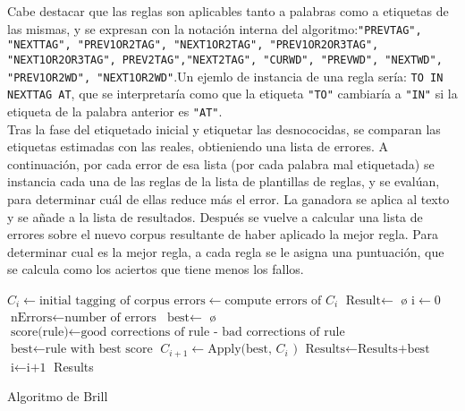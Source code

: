 Cabe destacar que las reglas son aplicables tanto a palabras como a etiquetas de las mismas, y se expresan con la notación interna del algoritmo:\newline \texttt{"PREVTAG", "NEXTTAG", "PREV1OR2TAG", "NEXT1OR2TAG", "PREV1OR2OR3TAG", "NEXT1OR2OR3TAG", PREV2TAG","NEXT2TAG",
 "CURWD", "PREVWD", "NEXTWD", "PREV1OR2WD", "NEXT1OR2WD"}.\newline Un ejemlo de instancia de una regla sería: \textcolor{SchoolColor}{\texttt{TO IN NEXTTAG AT}}, que se interpretaría como que la etiqueta \texttt{"TO"} cambiaría a \texttt{"IN"} si la etiqueta de la palabra anterior es \texttt{"AT"}. \\[\baselineskip]
 Tras la fase del etiquetado inicial y etiquetar las desnococidas, se comparan las etiquetas estimadas con las reales, obtieniendo una lista de errores. A continuación, por cada error de esa lista (por cada palabra mal etiquetada) se instancia cada una de las reglas de la lista de plantillas de reglas, y se evalúan, para determinar cuál de ellas reduce más el error. La ganadora se aplica al texto y se añade a la lista de resultados. Después se vuelve a calcular una lista de errores sobre el nuevo corpus resultante de haber aplicado la mejor regla. \newline
 Para determinar cual es la mejor regla, a cada regla se le asigna una puntuación, que se calcula como   
 los aciertos que tiene menos los fallos.    


\begin{algorithm}[H]
    \begin{algorithmic}[1]
    \State $\text{$C_{i}$} \gets \text{initial tagging of corpus}$
\State $\text{errors} \gets \text{compute errors of $C_{i}$}$
\State $\text{Result} \gets$ \o
\State $\text{i} \gets 0$
\State $\text{nErrors} \gets \text{number of errors}$
\State $\text{best}  \gets$ \o
{} 
            \State $\text{score(rule)} \gets \text{good corrections of rule - bad corrections of rule}$ 
            \EndFor
        \EndFor
        \State $\text{best} \gets \text{rule with best score}$
		\State $\text{$C_{i+1}$} \gets \text{Apply(best, $C_{i}$ )}$
		\State $\text{Results} \gets \text{Results+best}$
		\State $\text{i} \gets \text{i+1}$
        \EndWhile
        \EndProcedure
        \BState \Return Results
    \end{algorithmic}
    \label{alg:rAP}
    \caption{Algoritmo de Brill}
\end{algorithm}


